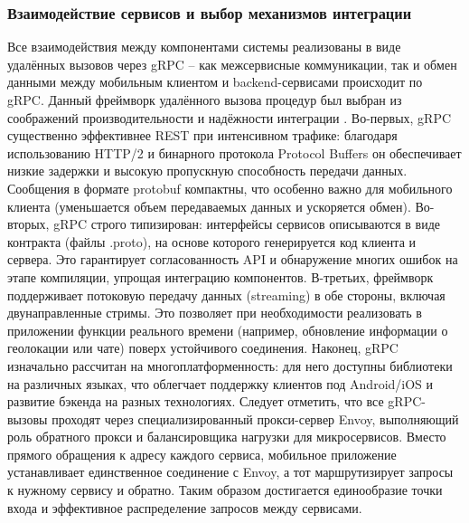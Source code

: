 \subsubsection*{Взаимодействие сервисов и выбор механизмов интеграции}
Все взаимодействия между компонентами системы реализованы в виде удалённых вызовов через gRPC – как межсервисные коммуникации, так и обмен данными между мобильным клиентом и backend-сервисами происходит по gRPC. Данный фреймворк удалённого вызова процедур был выбран из соображений производительности и надёжности интеграции \cite{1}. Во-первых, gRPC существенно эффективнее REST при интенсивном трафике: благодаря использованию HTTP/2 и бинарного протокола Protocol Buffers он обеспечивает низкие задержки и высокую пропускную способность передачи данных. Сообщения в формате protobuf компактны, что особенно важно для мобильного клиента (уменьшается объем передаваемых данных и ускоряется обмен). Во-вторых, gRPC строго типизирован: интерфейсы сервисов описываются в виде контракта (файлы .proto), на основе которого генерируется код клиента и сервера. Это гарантирует согласованность API и обнаружение многих ошибок на этапе компиляции, упрощая интеграцию компонентов. В-третьих, фреймворк поддерживает потоковую передачу данных (streaming) в обе стороны, включая двунаправленные стримы. Это позволяет при необходимости реализовать в приложении функции реального времени (например, обновление информации о геолокации или чате) поверх устойчивого соединения. Наконец, gRPC изначально рассчитан на многоплатформенность: для него доступны библиотеки на различных языках, что облегчает поддержку клиентов под Android/iOS и развитие бэкенда на разных технологиях.
Следует отметить, что все gRPC-вызовы проходят через специализированный прокси-сервер Envoy, выполняющий роль обратного прокси и балансировщика нагрузки для микросервисов. Вместо прямого обращения к адресу каждого сервиса, мобильное приложение устанавливает единственное соединение с Envoy, а тот маршрутизирует запросы к нужному сервису и обратно. Таким образом достигается единообразие точки входа и эффективное распределение запросов между сервисами.

